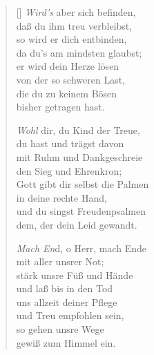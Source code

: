 \documentclass[fontsize=11pt]{scrartcl}
\begin{document}
\begin{multicols}{2}
\begin{verse}[\versewidth]
   \emph{Wird's} aber sich befinden,\\
  daß du ihm treu verbleibst,\\
  so wird er dich entbinden,\\
  da du's am mindsten glaubst;\\
  er wird dein Herze lösen\\
  von der so schweren Last,\\
  die du zu keinem Bösen\\
  bisher getragen hast.

   \emph{Wohl} dir, du Kind der Treue,\\
  du hast und trägst davon\\
  mit Ruhm und Dankgeschreie\\
  den Sieg und Ehrenkron;\\
  Gott gibt dir selbst die Palmen\\
  in deine rechte Hand,\\
  und du singst Freudenpsalmen\\
  dem, der dein Leid gewandt.

   \emph{Mach En}d, o Herr, mach Ende\\
  mit aller unsrer Not;\\
  stärk unsre Füß und Hände\\
  und laß bis in den Tod\\
  uns allzeit deiner Pflege\\
  und Treu empfohlen sein,\\
  so gehen unsre Wege\\
  gewiß zum Himmel ein.
  
  

\end{verse}
\end{multicols}
\end{document}
